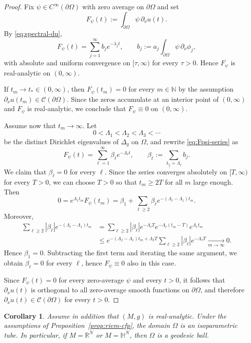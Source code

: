 \documentclass[a4paper,11pt]{article}
\newtheorem{corollary}[theorem]{Corollary}
\numberwithin{equation}{section}
\begin{document}
\begin{proof}
Fix $\psi\in C^\infty(\partial\Omega)$ with zero average on $\partial\Omega$ and
set
\[
F_\psi(t):=\int_{\partial\Omega}\psi\,\partial_\nu u(t).
\]
By \eqref{eq:spectral-du},
\begin{equation}\label{eq:Fpsi-series}
F_\psi(t)=\sum_{j=1}^\infty b_j e^{-\lambda_j t},
\qquad
b_j:=a_j\int_{\partial\Omega}\psi\,\partial_\nu\phi_j,
\end{equation}
with absolute and uniform convergence on $[\tau,\infty)$ for every $\tau>0$.
Hence $F_\psi$ is real-analytic on $(0,\infty)$.

If $t_m\to t_\ast\in(0,\infty)$, then $F_\psi(t_m)=0$ for every $m\in\mathbb{N}$ by the
assumption $\partial_\nu u(t_m)\in\mathcal C(\partial\Omega)$. Since the
zeros accumulate at an interior point of $(0,\infty)$ and $F_\psi$ is
real-analytic, we conclude that $F_\psi\equiv 0$ on $(0,\infty)$.

Assume now that $t_m\to\infty$. Let
\[
0<\Lambda_1<\Lambda_2<\Lambda_3<\cdots
\]
be the distinct Dirichlet eigenvalues of $\Delta_g$ on $\Omega$, and rewrite
\eqref{eq:Fpsi-series} as
\[
F_\psi(t)=\sum_{\ell=1}^\infty \beta_\ell e^{-\Lambda_\ell t},
\qquad
\beta_\ell:=\sum_{\lambda_j=\Lambda_\ell} b_j.
\]
We claim that $\beta_\ell=0$ for every $\ell$. Since the series converges
absolutely on $[T,\infty)$ for every $T>0$, we can choose $T>0$ so that
$t_m\geq 2T$ for all $m$ large enough. Then
\[
0=e^{\Lambda_1 t_m}F_\psi(t_m)
=\beta_1+\sum_{\ell\geq 2}\beta_\ell e^{-(\Lambda_\ell-\Lambda_1)t_m}.
\]
Moreover,
\begin{align*}
\sum_{\ell\geq 2} |\beta_\ell| e^{-(\Lambda_\ell-\Lambda_1)t_m}
&=
\sum_{\ell\geq 2} |\beta_\ell| e^{-\Lambda_\ell T}
e^{-\Lambda_\ell(t_m-T)}e^{\Lambda_1 t_m}\\
&\leq
e^{-(\Lambda_2-\Lambda_1)t_m+\Lambda_2 T}
\sum_{\ell\geq 2} |\beta_\ell|e^{-\Lambda_\ell T}\xrightarrow[m\to\infty]{}0.
\end{align*}
Hence $\beta_1=0$. Subtracting the first term and iterating the same argument,
we obtain $\beta_\ell=0$ for every $\ell$, hence $F_\psi\equiv 0$ also in this
case.

Since $F_\psi(t)=0$ for every zero-average $\psi$ and every $t>0$, it follows
that $\partial_\nu u(t)$ is orthogonal to all zero-average smooth
functions on $\partial\Omega$, and therefore
$\partial_\nu u(t)\in\mathcal C(\partial\Omega)$ for every $t>0$.
\end{proof}

\begin{corollary}\label{cor:riem-analytic}
Assume in addition that $(M,g)$ is real-analytic. Under the assumptions of
Proposition~\ref{prop:riem-cfp}, the domain $\Omega$ is an isoparametric tube.
In particular, if $M=\mathbb R^N$ or $M=\mathbb H^N$, then $\Omega$ is a
geodesic ball.
\end{corollary}
\end{document}
